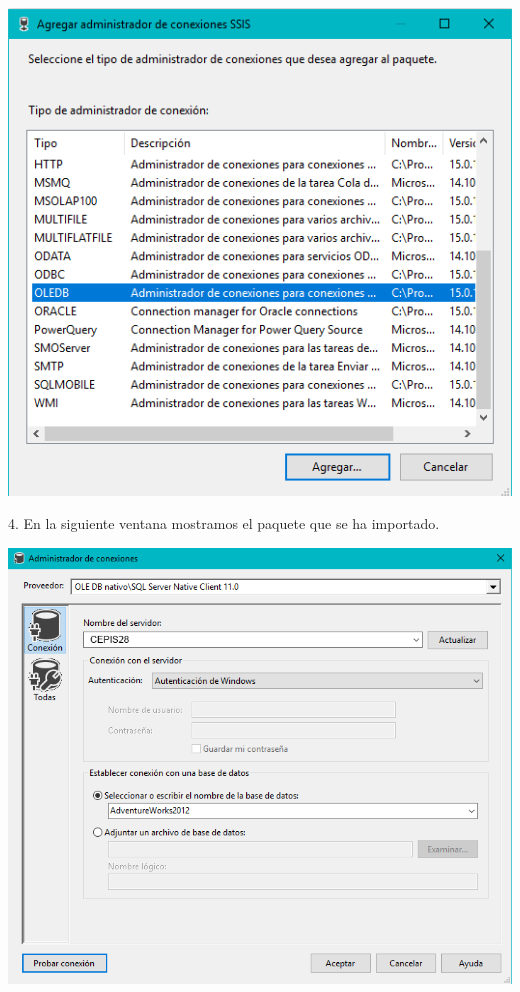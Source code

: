 	\begin{center}
	\includegraphics[width=\columnwidth]{images/task2/img18}
	\end{center}	

4. En la siguiente ventana mostramos el paquete que se ha importado.
	\begin{center}
	\includegraphics[width=\columnwidth]{images/task2/img19}
    \end{center}	
    
